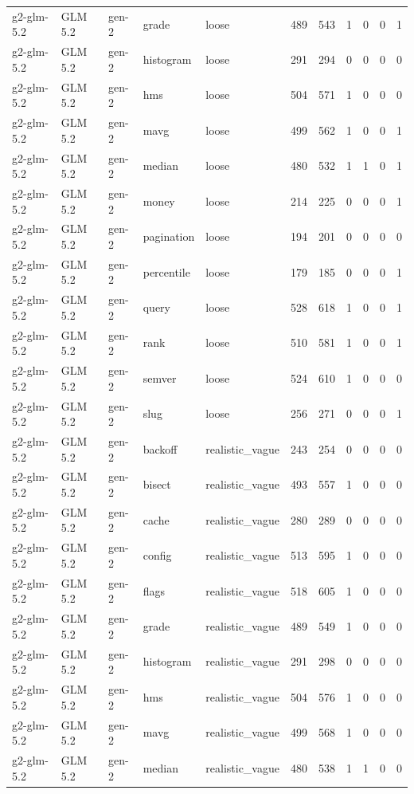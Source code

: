 \begin{tabular}{lllllllllll}
g2-glm-5.2 & GLM 5.2 & gen-2 & grade & loose & 489 & 543 & 1 & 0 & 0 & 1 \\
g2-glm-5.2 & GLM 5.2 & gen-2 & histogram & loose & 291 & 294 & 0 & 0 & 0 & 0 \\
g2-glm-5.2 & GLM 5.2 & gen-2 & hms & loose & 504 & 571 & 1 & 0 & 0 & 0 \\
g2-glm-5.2 & GLM 5.2 & gen-2 & mavg & loose & 499 & 562 & 1 & 0 & 0 & 1 \\
g2-glm-5.2 & GLM 5.2 & gen-2 & median & loose & 480 & 532 & 1 & 1 & 0 & 1 \\
g2-glm-5.2 & GLM 5.2 & gen-2 & money & loose & 214 & 225 & 0 & 0 & 0 & 1 \\
g2-glm-5.2 & GLM 5.2 & gen-2 & pagination & loose & 194 & 201 & 0 & 0 & 0 & 0 \\
g2-glm-5.2 & GLM 5.2 & gen-2 & percentile & loose & 179 & 185 & 0 & 0 & 0 & 1 \\
g2-glm-5.2 & GLM 5.2 & gen-2 & query & loose & 528 & 618 & 1 & 0 & 0 & 1 \\
g2-glm-5.2 & GLM 5.2 & gen-2 & rank & loose & 510 & 581 & 1 & 0 & 0 & 1 \\
g2-glm-5.2 & GLM 5.2 & gen-2 & semver & loose & 524 & 610 & 1 & 0 & 0 & 0 \\
g2-glm-5.2 & GLM 5.2 & gen-2 & slug & loose & 256 & 271 & 0 & 0 & 0 & 1 \\
g2-glm-5.2 & GLM 5.2 & gen-2 & backoff & realistic\_vague & 243 & 254 & 0 & 0 & 0 & 0 \\
g2-glm-5.2 & GLM 5.2 & gen-2 & bisect & realistic\_vague & 493 & 557 & 1 & 0 & 0 & 0 \\
g2-glm-5.2 & GLM 5.2 & gen-2 & cache & realistic\_vague & 280 & 289 & 0 & 0 & 0 & 0 \\
g2-glm-5.2 & GLM 5.2 & gen-2 & config & realistic\_vague & 513 & 595 & 1 & 0 & 0 & 0 \\
g2-glm-5.2 & GLM 5.2 & gen-2 & flags & realistic\_vague & 518 & 605 & 1 & 0 & 0 & 0 \\
g2-glm-5.2 & GLM 5.2 & gen-2 & grade & realistic\_vague & 489 & 549 & 1 & 0 & 0 & 0 \\
g2-glm-5.2 & GLM 5.2 & gen-2 & histogram & realistic\_vague & 291 & 298 & 0 & 0 & 0 & 0 \\
g2-glm-5.2 & GLM 5.2 & gen-2 & hms & realistic\_vague & 504 & 576 & 1 & 0 & 0 & 0 \\
g2-glm-5.2 & GLM 5.2 & gen-2 & mavg & realistic\_vague & 499 & 568 & 1 & 0 & 0 & 0 \\
g2-glm-5.2 & GLM 5.2 & gen-2 & median & realistic\_vague & 480 & 538 & 1 & 1 & 0 & 0 \\

\end{tabular}
